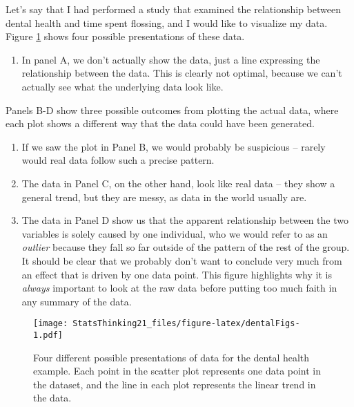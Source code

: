\documentclass[]{book}
\providecommand{\tightlist}{%
  \setlength{\itemsep}{0pt}\setlength{\parskip}{0pt}}
\theoremstyle{definition}
\theoremstyle{definition}
\theoremstyle{definition}
\theoremstyle{remark}
\begin{document}
Let's say that I had performed a study that examined the relationship
between dental health and time spent flossing, and I would like to
visualize my data. Figure \ref{fig:dentalFigs} shows four possible
presentations of these data.

\begin{enumerate}
\def\labelenumi{\arabic{enumi}.}
\tightlist
\item
  In panel A, we don't actually show the data, just a line expressing
  the relationship between the data. This is clearly not optimal,
  because we can't actually see what the underlying data look like.
\end{enumerate}

Panels B-D show three possible outcomes from plotting the actual data,
where each plot shows a different way that the data could have been
generated.

\begin{enumerate}
\def\labelenumi{\arabic{enumi}.}
\setcounter{enumi}{1}
\tightlist
\item
  If we saw the plot in Panel B, we would probably be suspicious --
  rarely would real data follow such a precise pattern.\\
\item
  The data in Panel C, on the other hand, look like real data -- they
  show a general trend, but they are messy, as data in the world usually
  are.\\
\item
  The data in Panel D show us that the apparent relationship between the
  two variables is solely caused by one individual, who we would refer
  to as an \emph{outlier} because they fall so far outside of the
  pattern of the rest of the group. It should be clear that we probably
  don't want to conclude very much from an effect that is driven by one
  data point. This figure highlights why it is \emph{always} important
  to look at the raw data before putting too much faith in any summary
  of the data.
\end{enumerate}

\begin{figure}
\centering
\texttt{[image: StatsThinking21\_files/figure-latex/dentalFigs-1.pdf]}
\caption{\label{fig:dentalFigs}Four different possible presentations of data
for the dental health example. Each point in the scatter plot represents
one data point in the dataset, and the line in each plot represents the
linear trend in the data.}
\end{figure}
\end{document}
